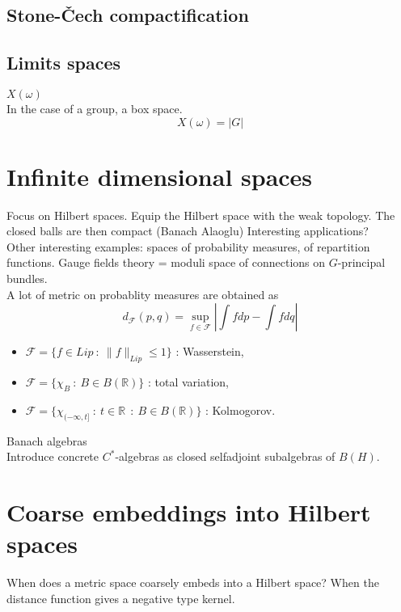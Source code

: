 \subsection{Stone-\v{C}ech compactification}

\subsection{Limits spaces}

$X(\omega)$ \\

In the case of a group, a box space.
\[X(\omega) = |G| \]

\section{Infinite dimensional spaces}

Focus on Hilbert spaces. Equip the Hilbert space with the weak topology. The closed balls are then compact (Banach Alaoglu) Interesting applications?\\

Other interesting examples: spaces of probability measures, of repartition functions. Gauge fields theory = moduli space of connections on $G$-principal bundles.\\
A lot of metric on probablity measures are obtained as
\[d_{\mathcal F}(p,q) = \sup_{f\in \mathcal F} | \int f dp - \int f dq |\]
\begin{itemize}
\item $\mathcal F = \{f\in Lip \ : \  \| f\|_{Lip}\leq 1\}$ : Wasserstein,
\item $\mathcal F = \{\chi_B \ : \ B\in B(\mathbb R)\}$ : total variation,
\item $\mathcal F = \{\chi_{(-\infty , t]} \ : \ t\in \mathbb R \ \ : \ B\in B(\mathbb R)\}$ : Kolmogorov.
\end{itemize}
Banach algebras\\
Introduce concrete $C^*$-algebras as closed selfadjoint subalgebras of $B(H)$.\\

\section{Coarse embeddings into Hilbert spaces}

When does a metric space coarsely embeds into a Hilbert space? When the distance function gives a negative type kernel.\\


